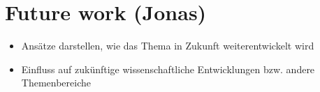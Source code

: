 \section{Future work (Jonas)}
\begin{itemize}
\item Ansätze darstellen, wie das Thema in Zukunft weiterentwickelt wird
\item Einfluss auf zukünftige wissenschaftliche Entwicklungen bzw. andere Themenbereiche
\end{itemize}
